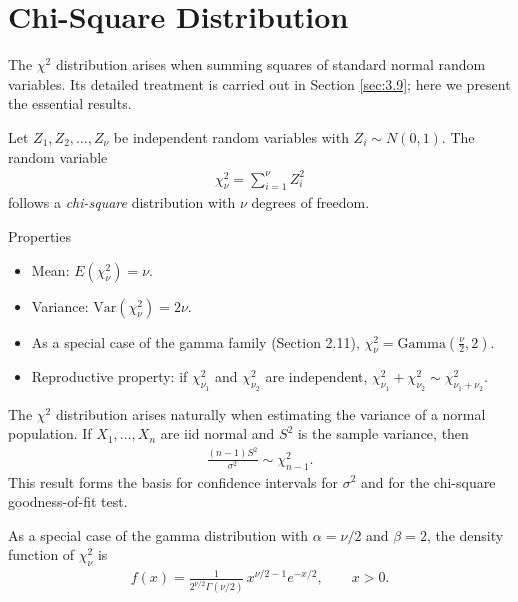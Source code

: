 \section{Chi-Square Distribution}

The $\chi^2$ distribution arises when summing squares of standard normal random variables. Its detailed treatment is carried out in Section \ref{sec:3.9}; here we present the essential results.

\begin{definicion}
Let $Z_1, Z_2, \ldots, Z_\nu$ be independent random variables with $Z_i \sim N(0,1)$. The random variable
\begin{align}
 \label{eq:3.2.11}
 \chi^2_\nu = \sum_{i=1}^\nu Z_i^2
\end{align}
follows a \emph{chi-square} distribution with $\nu$ degrees of freedom.
\end{definicion}

{Properties}
\begin{itemize}
 \item Mean: $E(\chi^2_\nu) = \nu$.
 \item Variance: $\text{Var}(\chi^2_\nu) = 2\nu$.
 \item As a special case of the gamma family (Section 2.11), $\chi^2_\nu = \text{Gamma}\!\left(\frac{\nu}{2}, 2\right)$.
 \item Reproductive property: if $\chi^2_{\nu_1}$ and $\chi^2_{\nu_2}$ are independent, $\chi^2_{\nu_1} + \chi^2_{\nu_2} \sim \chi^2_{\nu_1 + \nu_2}$.
\end{itemize}

\begin{observacion}
The $\chi^2$ distribution arises naturally when estimating the variance of a normal population. If $X_1, \ldots, X_n$ are iid normal and $S^2$ is the sample variance, then
\begin{align}
 \frac{(n-1)S^2}{\sigma^2} \sim \chi^2_{n-1}.
\end{align}
This result forms the basis for confidence intervals for $\sigma^2$ and for the chi-square goodness-of-fit test.
\end{observacion}

\begin{definicion}
 \label{eq:5.3.1}
As a special case of the gamma distribution with $\alpha=\nu/2$ and $\beta=2$, the density function of $\chi^2_\nu$ is
\begin{align}
 f(x) = \frac{1}{2^{\nu/2}\Gamma(\nu/2)}\,x^{\nu/2-1}e^{-x/2}, \qquad x > 0.
\end{align}
\end{definicion}

